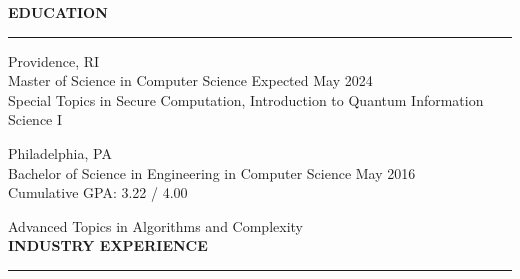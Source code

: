 \documentclass{resume} %
\begin{document}

\medskip
\MakeUppercase{{\bf Education}}
\medskip
\hrule

\hspace*{1mm}{\bf Brown University} \hfill Providence, RI \\
\hspace*{1mm}Master of Science in Computer Science \hfill Expected May 2024 \\

\vspace{-4mm}
\hspace*{1mm}{\em Relevant Courses:} Special Topics in Secure Computation, Introduction to Quantum Information Science I

\hspace*{1mm}{\bf University of Pennsylvania} \hfill Philadelphia, PA \\
\hspace*{1mm}Bachelor of Science in Engineering in Computer Science \hfill May 2016 \\
\hspace*{1mm}Cumulative GPA: 3.22 / 4.00

\hspace*{1mm}{\em Relevant Courses:} Advanced Topics in Algorithms and Complexity \\




\medskip
\MakeUppercase{{\bf Industry Experience}}
\medskip
\hrule
\end{document}
